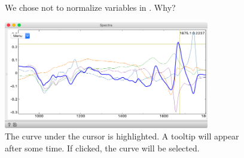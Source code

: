 \begin{figure}[h]
\centering
{}
\caption{We chose not to normalize variables in . Why?}

\end{figure}

\begin{figure}
  \includegraphics[width=0.8\textwidth]{graphics/ch-spectral_PCA/components.png}%
  \caption{The curve under the cursor is highlighted. A tooltip will appear after some time. If clicked, the curve will be selected.}
\end{figure}


